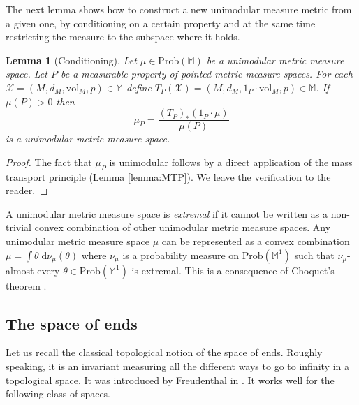 \documentclass{amsart}
\newcommand{\MM}{\mathbb{M}}
\newcommand{\vol}{\mathrm{vol}}
\theoremstyle{plain}
\newtheorem{lemma}[theorem]{Lemma}
\numberwithin{equation}{section}
\theoremstyle{definition}
\begin{document}
The next lemma shows how to construct a new unimodular measure metric from a given one, by conditioning on a certain property and at the same time restricting the measure to the subspace where it holds.

\begin{lemma}[Conditioning]
\label{lemma:condional unimodular}
Let $\mu \in \mathrm{Prob}(\MM)$ be a unimodular metric measure space. Let $P$ be a measurable property of pointed metric measure spaces. For each 
$\mathcal{X} = (M,d_M,\vol_M,p) \in \MM$ define $T_P(\mathcal{X}) = (M,d_M,1_P\cdot\mathrm{vol}_M,p) \in \MM $. If $\mu(P) > 0$ then
$$\mu_P = \frac{(T_P)_* (1_P \cdot \mu)}{\mu(P)}  $$
is a unimodular metric measure space.
\end{lemma}
\begin{proof}
The fact that $\mu_P$ is unimodular follows by a direct application of the mass transport principle (Lemma \ref{lemma:MTP}). We leave the verification to the reader.
\end{proof}

A unimodular metric measure space  is \emph{extremal} if it cannot be written as a non-trivial convex combination of other unimodular metric measure spaces. Any unimodular  metric measure space $\mu$ can be represented as a convex combination $\mu = \int \theta \; \mathrm{d} \nu_\mu(\theta)$ where $\nu_\mu$ is a probability measure on $\mathrm{Prob}(\MM^1)$ such that $\nu_\mu$-almost every $\theta \in \mathrm{Prob}(\MM^1)$ is extremal. This is a consequence of Choquet's theorem \cite[Theorem \S3]{phelps2003lectures}.

\subsection{The space of ends}
Let us recall the classical topological notion of the space of ends. Roughly speaking, it is an invariant measuring all the different ways to go to infinity in a topological space. It was introduced by
Freudenthal in \cite{freudenthal1931enden}. It works well for the following class of spaces.
\end{document}
